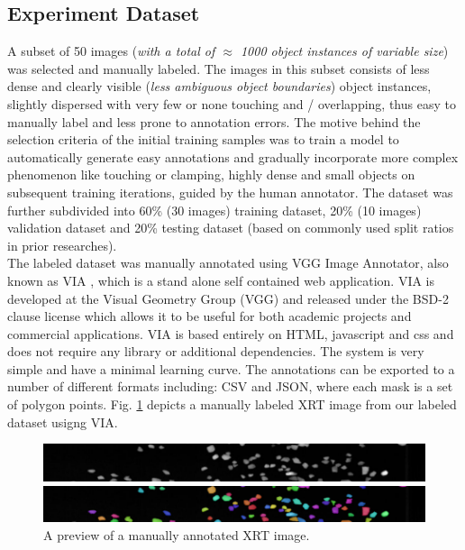 \documentclass[conference]{IEEEtran}
\begin{document}
	\subsection{Experiment Dataset}
		
		A subset of 50 images (\textit{with a total of $\approx$ 1000 object instances of variable size}) was selected and manually labeled. The images in this subset
consists of less dense and clearly visible (\textit{less ambiguous object boundaries}) object instances, slightly dispersed with very few or none touching and / overlapping, thus easy
to manually label and less prone to annotation errors. The motive behind the selection criteria of the initial training samples was to train a model to automatically generate easy annotations and gradually incorporate more complex phenomenon like touching or
 clamping, highly dense and small objects on subsequent training iterations, guided by the human annotator. The dataset was further subdivided into 60\% (30 images) training dataset, 20\% (10 images) validation dataset and 20\% testing dataset (based on commonly
used split ratios in prior researches).\\
		
		The labeled dataset was manually annotated using VGG Image Annotator, also known as VIA \cite{Dutta}, which is a stand alone self contained web application. VIA is developed at the Visual Geometry Group (VGG) and released under the BSD-2 clause license which allows it to be useful for both academic projects and commercial applications. VIA is based entirely on HTML, javascript and css and does not require any library or additional dependencies. The system is very simple and have a minimal learning curve. The annotations can be exported to a number of different formats including: CSV and JSON, where each mask is a set of polygon points. Fig. \ref{XRT Ground-truth} depicts a manually labeled XRT image from our labeled dataset usigng VIA.
		
		\begin{figure}[htbp]
			\centering
			\includegraphics[width=1\linewidth]{2-raw-image.png}
			
			\vspace{.1cm}
			
			\includegraphics[width=1\linewidth]{2-ground-truth.png}
			\caption{A preview of a manually annotated XRT image.}
			\label{XRT Ground-truth}
		\end{figure}
	
\end{document}
